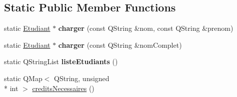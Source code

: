 \subsection*{Static Public Member Functions}
\begin{DoxyCompactItemize}
\item 
\hypertarget{classEtudiant_af9f1b33459e9d35fb759b604ee674ced}{static \hyperlink{classEtudiant}{Etudiant} $\ast$ {\bfseries charger} (const Q\+String \&nom, const Q\+String \&prenom)}\label{classEtudiant_af9f1b33459e9d35fb759b604ee674ced}

\item 
\hypertarget{classEtudiant_a4513003f4ebb1f5232c02f6946c79d4a}{static \hyperlink{classEtudiant}{Etudiant} $\ast$ {\bfseries charger} (const Q\+String \&nom\+Complet)}\label{classEtudiant_a4513003f4ebb1f5232c02f6946c79d4a}

\item 
\hypertarget{classEtudiant_a7e4bf797b538d319d6bf80115d379437}{static Q\+String\+List {\bfseries liste\+Etudiants} ()}\label{classEtudiant_a7e4bf797b538d319d6bf80115d379437}

\item 
static Q\+Map$<$ Q\+String, unsigned \\*
int $>$ \hyperlink{classEtudiant_a4cdc782c0710febb617b2a25a0859fa9}{credits\+Necessaires} ()
\end{DoxyCompactItemize}
